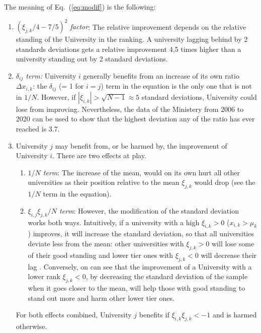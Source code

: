 \documentclass[twocolumn]{article}
\def\eqref#1{Eq.~(\ref{eq:#1})}
\begin{document}
The meaning of \eqref{modif} is the following:
\begin{enumerate}
    \item \emph{$(\xi_{j,k}/4 - 7/5)^2$ factor}:  The relative improvement depends on the relative standing of the University in the ranking.  A university lagging behind by 2 standards deviations gets a relative improvement 4,5 times higher than a university standing out by 2 standard deviations.
    \item \emph{$\delta_{ij}$ term:} University $i$ generally benefits from an increase of its own ratio $\Delta x_{i,k}$: the $\delta_{ij}$ (= 1 for $i = j$) term in the equation is the only one that is not in $1/N$. However, if $|\xi_{i,k}| > \sqrt{N - 1} \approx 5$ standard deviations, University could lose from improving.  Nevertheless, the data of the Ministery from 2006 to 2020 can be used to show that the highest deviation any of the ratio has ever reached is 3.7.
    \item University $j$ may benefit from, or be harmed by, the improvement of University $i$.  There are two effects at play.  
    \begin{enumerate}
    \item \emph{$1/N$ term}: The increase of the mean, would on its own hurt all other universities as their position relative to the mean $\xi_{j,k}$ would drop (see the $1/N$ term in the equation).  
    \item \emph{$\xi_{i,j}\xi_{j,k}/N$ term}: However, the modification of the standard deviation works both ways. Intuitively, if a university with a high $\xi_{i,k} > 0$ ($x_{i,k} > \mu_k$) improves, it will increase the standard deviation, so that all universities deviate less from the mean: other universities with $\xi_{j,k} > 0$ will lose some of their good standing and lower tier ones with $\xi_{j,k} < 0$ will decrease their lag . Conversely, on can see that the improvement of a University with a lower rank $\xi_{j,k} < 0$, by decreasing the standard deviation of the sample when it goes closer to the mean, will help those with good standing to stand out more and harm other lower tier ones. 
\end{enumerate}
    For both effects combined, University $j$ benefits if $\xi_{i,k}\xi_{j,k} < -1$ and is harmed otherwise. 
\end{enumerate}
\end{document}

